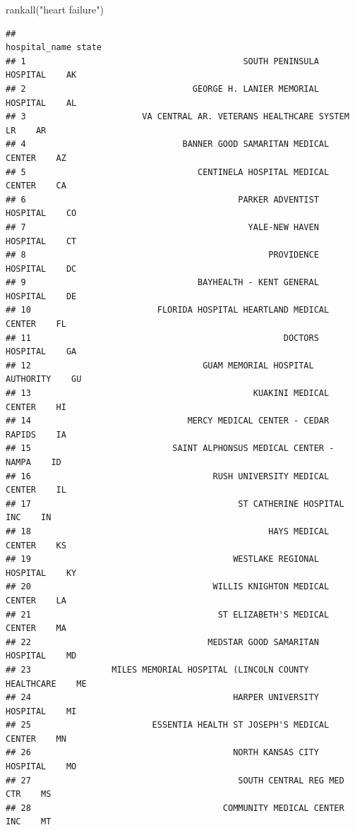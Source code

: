 \documentclass[
]{book}
\newenvironment{Shaded}{\begin{snugshade}}{\end{snugshade}}
\newcommand{\FunctionTok}[1]{\textcolor[rgb]{0.00,0.00,0.00}{#1}}
\newcommand{\NormalTok}[1]{#1}
\newcommand{\StringTok}[1]{\textcolor[rgb]{0.31,0.60,0.02}{#1}}
\theoremstyle{definition}
\theoremstyle{definition}
\theoremstyle{definition}
\theoremstyle{definition}
\theoremstyle{remark}
\begin{document}
\begin{Shaded}
\begin{Highlighting}[]
\FunctionTok{rankall}\NormalTok{(}\StringTok{"heart failure"}\NormalTok{)}
\end{Highlighting}
\end{Shaded}

\begin{verbatim}
##                                                        hospital_name state
## 1                                           SOUTH PENINSULA HOSPITAL    AK
## 2                                 GEORGE H. LANIER MEMORIAL HOSPITAL    AL
## 3                       VA CENTRAL AR. VETERANS HEALTHCARE SYSTEM LR    AR
## 4                               BANNER GOOD SAMARITAN MEDICAL CENTER    AZ
## 5                                  CENTINELA HOSPITAL MEDICAL CENTER    CA
## 6                                          PARKER ADVENTIST HOSPITAL    CO
## 7                                            YALE-NEW HAVEN HOSPITAL    CT
## 8                                                PROVIDENCE HOSPITAL    DC
## 9                                  BAYHEALTH - KENT GENERAL HOSPITAL    DE
## 10                         FLORIDA HOSPITAL HEARTLAND MEDICAL CENTER    FL
## 11                                                  DOCTORS HOSPITAL    GA
## 12                                  GUAM MEMORIAL HOSPITAL AUTHORITY    GU
## 13                                            KUAKINI MEDICAL CENTER    HI
## 14                               MERCY MEDICAL CENTER - CEDAR RAPIDS    IA
## 15                            SAINT ALPHONSUS MEDICAL CENTER - NAMPA    ID
## 16                                    RUSH UNIVERSITY MEDICAL CENTER    IL
## 17                                         ST CATHERINE HOSPITAL INC    IN
## 18                                               HAYS MEDICAL CENTER    KS
## 19                                        WESTLAKE REGIONAL HOSPITAL    KY
## 20                                    WILLIS KNIGHTON MEDICAL CENTER    LA
## 21                                     ST ELIZABETH'S MEDICAL CENTER    MA
## 22                                   MEDSTAR GOOD SAMARITAN HOSPITAL    MD
## 23                MILES MEMORIAL HOSPITAL (LINCOLN COUNTY HEALTHCARE    ME
## 24                                        HARPER UNIVERSITY HOSPITAL    MI
## 25                        ESSENTIA HEALTH ST JOSEPH'S MEDICAL CENTER    MN
## 26                                        NORTH KANSAS CITY HOSPITAL    MO
## 27                                         SOUTH CENTRAL REG MED CTR    MS
## 28                                      COMMUNITY MEDICAL CENTER INC    MT

\end{verbatim}
\end{document}
